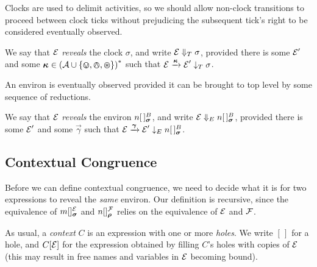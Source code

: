 \documentclass[orivec,envcountsame]{llncs}
\begin{document}
Clocks are used to delimit activities, so we should allow non-clock transitions
to proceed between clock ticks without prejudicing the subsequent tick's
right to be considered eventually observed.

\begin{definition}
We say that $\text{$\mathcal{E}$}$ \emph{reveals} the clock $\sigma$, and write $\text{$\mathcal{E}$}
\mathrel{\Downarrow_{T}} \sigma$, provided there is some $\text{$\mathcal{E}$}'$ and some $\vec{\kappa} \in
\left( \actions \cup \{ \tin, \tout, \topen \}\right)^*$ such that $\expr
\Does{\vec{\kappa}} \expr' \ExhibitsT \sigma$.
\end{definition}

An environ is eventually observed provided it can be brought to top
level by some sequence of reductions.

\begin{definition}

We say that $\text{$\mathcal{E}$}$ \emph{reveals} the environ $\locv{n}{\,}{B}{\vec{\sigma}}$,
and write $\expr \RevealsE \locv{n}{\,}{B}{\vec{\sigma}}$, provided there is
some $\text{$\mathcal{E}$}'$ and some $\vec{\gamma}$ such that $\expr \Does{\vec{\gamma}}
\expr' \ExhibitsE \locv{n}{\,}{B}{\vec{\sigma}}$.

\end{definition}


\subsection{Contextual Congruence}
\label{sec:contextual-congruence}

Before we can define contextual congruence, we need to decide what it is for 
two expressions to reveal the \emph{same} environ. Our definition is
recursive, since the equivalence of $\locv{m}{}{\expr}{\vec{\sigma}}$ and
$\locv{n}{}{\exprb}{\vec{\rho}}$ relies on the equivalence of $\text{$\mathcal{E}$}$ and
$\text{$\mathcal{F}$}$.

As usual, a \emph{context} $C$ is an expression with one or more
\emph{holes}. We write $[\,]$ for a hole, and $C[\text{$\mathcal{E}$}]$ for the expression
obtained by filling $C$'s holes with copies of $\text{$\mathcal{E}$}$ (this may result
in free names and variables in $\text{$\mathcal{E}$}$ becoming bound).
\end{document}
